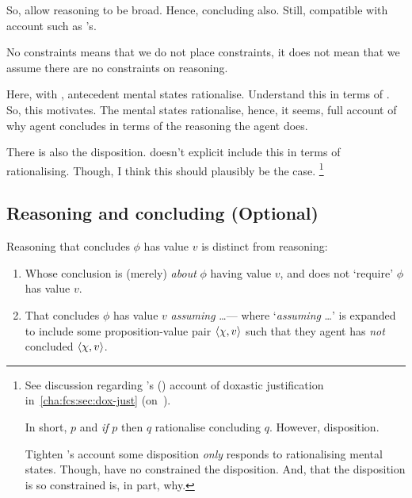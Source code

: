 \begin{note}
  So, allow reasoning to be broad.
  Hence, concluding also.
  Still, compatible with account such as \citeauthor{Wedgwood:2006ui}'s.

  No constraints means that we do not place constraints, it does not mean that we assume there are no constraints on reasoning.
\end{note}

\begin{note}
  Here, with \citeauthor{Wedgwood:2006ui}, antecedent mental states rationalise.
  Understand this in terms of \qWhy{}.
  So, this motivates.
  The mental states rationalise, hence, it seems, full account of why agent concludes in terms of the reasoning the agent does.

  There is also the disposition.
  \citeauthor{Wedgwood:2006ui} doesn't explicit include this in terms of rationalising.
  Though, I think this should plausibly be the case.%
  \footnote{
    See discussion regarding \citeauthor{Turri:2010aa}'s (\citeyear{Turri:2010aa}) account of doxastic justification in~\autoref{cha:fcs:sec:dox-just} (on~).

    In short, \(p\) and \emph{if} \(p\) then \(q\) rationalise concluding \(q\).
    However, disposition.

    Tighten \citeauthor{Wedgwood:2006ui}'s account some disposition \emph{only} responds to rationalising mental states.
    Though, have no constrained the disposition.
    And, that the disposition is so constrained is, in part, why.
  }
\end{note}

\subsection[Reasoning-to vs.\ concluding]{Reasoning and concluding \hfill (Optional)}

\begin{note}
  Reasoning that concludes \(\phi\) has value \(v\) is distinct from reasoning:
  \begin{enumerate}[label=\Alph*., ref=(\Alph*)]
  \item
    \label{CS:delicacy:O}
    Whose conclusion is (merely) \emph{about} \(\phi\) having value \(v\), and does not `require' \(\phi\) has value \(v\).
  \item
    \label{CS:delicacy:A}
    That concludes \(\phi\) has value \(v\) \emph{assuming} \dots\space --- where `\emph{assuming} \dots\space' is expanded to include some proposition-value pair \(\langle \chi, v \rangle\) such that they agent has \emph{not} concluded \(\langle \chi, v \rangle\).
  \end{enumerate}
\end{note}

